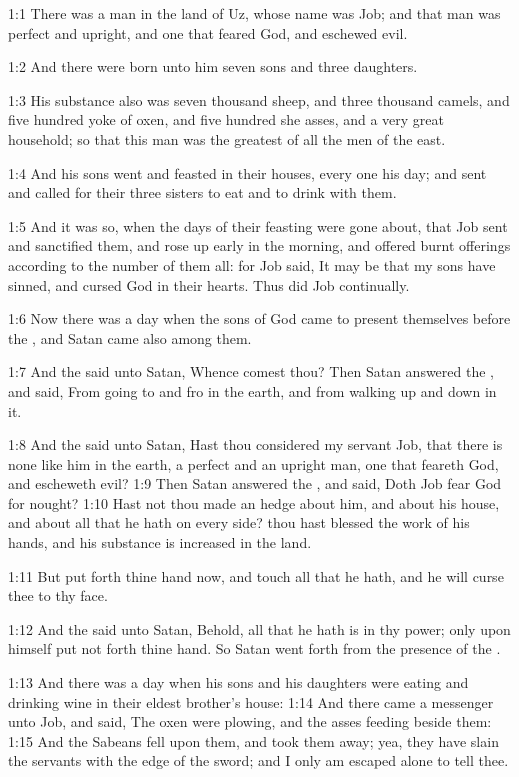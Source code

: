 

1:1 There was a man in the land of Uz, whose name was Job; and that man was perfect and upright, and one that feared God, and eschewed evil.

1:2 And there were born unto him seven sons and three daughters.

1:3 His substance also was seven thousand sheep, and three thousand camels, and five hundred yoke of oxen, and five hundred she asses, and a very great household; so that this man was the greatest of all the men of the east.

1:4 And his sons went and feasted in their houses, every one his day; and sent and called for their three sisters to eat and to drink with them.

1:5 And it was so, when the days of their feasting were gone about, that Job sent and sanctified them, and rose up early in the morning, and offered burnt offerings according to the number of them all: for Job said, It may be that my sons have sinned, and cursed God in their hearts. Thus did Job continually.

1:6 Now there was a day when the sons of God came to present themselves before the \LORD, and Satan came also among them.

1:7 And the \LORD said unto Satan, Whence comest thou? Then Satan answered the \LORD, and said, From going to and fro in the earth, and from walking up and down in it.

1:8 And the \LORD said unto Satan, Hast thou considered my servant Job, that there is none like him in the earth, a perfect and an upright man, one that feareth God, and escheweth evil?  1:9 Then Satan answered the \LORD, and said, Doth Job fear God for nought?  1:10 Hast not thou made an hedge about him, and about his house, and about all that he hath on every side? thou hast blessed the work of his hands, and his substance is increased in the land.

1:11 But put forth thine hand now, and touch all that he hath, and he will curse thee to thy face.

1:12 And the \LORD said unto Satan, Behold, all that he hath is in thy power; only upon himself put not forth thine hand. So Satan went forth from the presence of the \LORD.

1:13 And there was a day when his sons and his daughters were eating and drinking wine in their eldest brother's house: 1:14 And there came a messenger unto Job, and said, The oxen were plowing, and the asses feeding beside them: 1:15 And the Sabeans fell upon them, and took them away; yea, they have slain the servants with the edge of the sword; and I only am escaped alone to tell thee.

